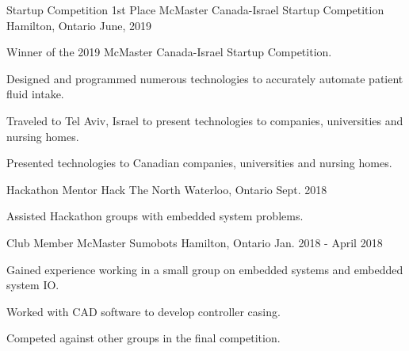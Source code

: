 
\begin{cventries}

  \cventry
    {Startup Competition 1st Place} %
    {McMaster Canada-Israel Startup Competition} %
    {Hamilton, Ontario} %
    {June, 2019} %
    {
      \begin{cvitems} %
        \item {Winner of the 2019 McMaster Canada-Israel Startup Competition.}
        \item {Designed and programmed numerous technologies to accurately automate patient fluid intake.}
        \item {Traveled to Tel Aviv, Israel to present technologies to companies, universities and nursing homes.}
        \item {Presented technologies to Canadian companies, universities and nursing homes.}
      \end{cvitems}
    }

  \cventry
    {Hackathon Mentor} %
    {Hack The North} %
    {Waterloo, Ontario} %
    {Sept. 2018} %
    {
      \begin{cvitems} %
        \item {Assisted Hackathon groups with embedded system problems.}
      \end{cvitems}
    }

  \cventry
    {Club Member} %
    {McMaster Sumobots} %
    {Hamilton, Ontario} %
    {Jan. 2018 - April 2018} %
    {
      \begin{cvitems} %
        \item {Gained experience working in a small group on embedded systems and embedded system IO.}
        \item {Worked with CAD software to develop controller casing.}
        \item {Competed against other groups in the final competition.}
      \end{cvitems}
    }
    

\end{cventries}
